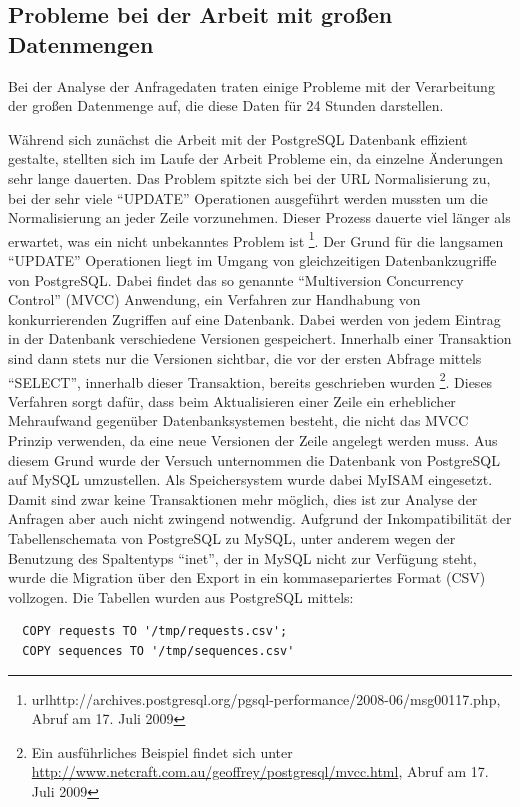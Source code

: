 \documentclass[10pt]{scrartcl}
\begin{document}
\subsection{Probleme bei der Arbeit mit großen Datenmengen}
\label{subsection:problems_with_large_amounts_of_data}
Bei der Analyse der Anfragedaten traten einige Probleme mit der Verarbeitung der großen Datenmenge auf, die diese Daten für 24 Stunden darstellen.

Während sich zunächst die Arbeit mit der PostgreSQL Datenbank effizient gestalte, stellten sich im Laufe der Arbeit Probleme ein, da einzelne Änderungen sehr lange dauerten. Das Problem spitzte sich bei der URL Normalisierung zu, bei der sehr viele ``UPDATE'' Operationen ausgeführt werden mussten um die Normalisierung an jeder Zeile vorzunehmen. Dieser Prozess dauerte viel länger als erwartet, was ein nicht unbekanntes Problem ist \footnote{url{http://archives.postgresql.org/pgsql-performance/2008-06/msg00117.php}, Abruf am 17. Juli 2009}. Der Grund für die langsamen ``UPDATE'' Operationen liegt im Umgang von gleichzeitigen Datenbankzugriffe von PostgreSQL. Dabei findet das so genannte ``Multiversion Concurrency Control'' (MVCC) Anwendung, ein Verfahren zur Handhabung von konkurrierenden Zugriffen auf eine Datenbank. Dabei werden von jedem Eintrag in der Datenbank verschiedene Versionen gespeichert. Innerhalb einer Transaktion sind dann stets nur die Versionen sichtbar, die vor der ersten Abfrage mittels ``SELECT'', innerhalb dieser Transaktion, bereits geschrieben wurden \footnote{Ein ausführliches Beispiel findet sich unter \url{http://www.netcraft.com.au/geoffrey/postgresql/mvcc.html}, Abruf am 17. Juli 2009}. Dieses Verfahren sorgt dafür, dass beim Aktualisieren einer Zeile ein erheblicher Mehraufwand gegenüber Datenbanksystemen besteht, die nicht das MVCC Prinzip verwenden, da eine neue Versionen der Zeile angelegt werden muss. Aus diesem Grund wurde der Versuch unternommen die Datenbank von PostgreSQL auf MySQL umzustellen. Als Speichersystem wurde dabei MyISAM eingesetzt. Damit sind zwar keine Transaktionen mehr möglich, dies ist zur Analyse der Anfragen aber auch nicht zwingend notwendig. Aufgrund der Inkompatibilität der Tabellenschemata von PostgreSQL zu MySQL, unter anderem wegen der Benutzung des Spaltentyps ``inet'', der in MySQL nicht zur Verfügung steht, wurde die Migration über den Export in ein kommasepariertes Format (CSV) vollzogen. Die Tabellen wurden aus PostgreSQL mittels:

\begin{verbatim}
  COPY requests TO '/tmp/requests.csv';
  COPY sequences TO '/tmp/sequences.csv'
\end{verbatim}
\end{document}
